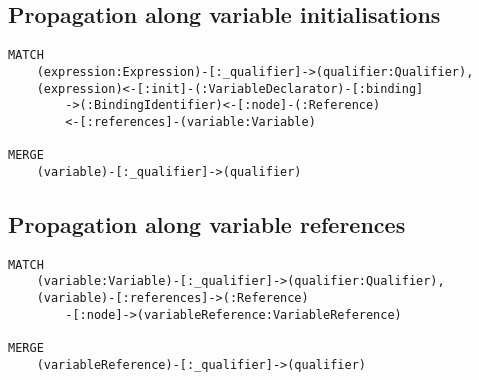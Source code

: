 \subsection{Propagation along variable initialisations}
\begin{lstlisting}[language=Cypher]
MATCH
    (expression:Expression)-[:_qualifier]->(qualifier:Qualifier),
    (expression)<-[:init]-(:VariableDeclarator)-[:binding]
        ->(:BindingIdentifier)<-[:node]-(:Reference)
        <-[:references]-(variable:Variable)

MERGE
    (variable)-[:_qualifier]->(qualifier)
\end{lstlisting}


\newpage
\subsection{Propagation along variable references}
\begin{lstlisting}[language=Cypher]
MATCH
    (variable:Variable)-[:_qualifier]->(qualifier:Qualifier),
    (variable)-[:references]->(:Reference)
        -[:node]->(variableReference:VariableReference)

MERGE
    (variableReference)-[:_qualifier]->(qualifier)
\end{lstlisting}